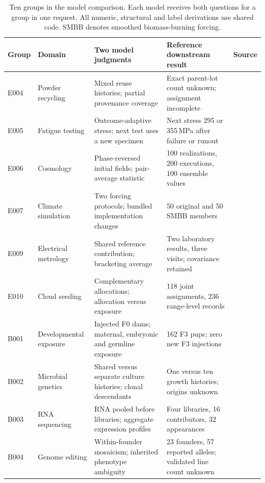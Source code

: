\begin{table}[t]
\centering
\footnotesize
\setlength{\tabcolsep}{4pt}
\begin{tabular}{@{}p{}p{}p{}p{}p{}@{}}
\toprule
Group & Domain & Two model judgments & Reference downstream result & Source \\
\midrule
E004 & Powder recycling & Mixed reuse histories; partial provenance coverage & Exact parent-lot count unknown; assignment incomplete & \citep{koushik2023effective} \\
E005 & Fatigue testing & Outcome-adaptive stress; next test uses a new specimen & Next stress 295 or 355\,MPa after failure or runout & \citep{magazzeni2023bayesian} \\
E006 & Cosmology & Phase-reversed initial fields; pair-average statistic & 100 realizations, 200 executions, 100 ensemble values & \citep{villaescusa2018statistical} \\
E007 & Climate simulation & Two forcing protocols; bundled implementation changes & 50 original and 50 SMBB members & \citep{ncarUndatedLens2} \\
E009 & Electrical metrology & Shared reference contribution; bracketing average & Two laboratory results, three visits; covariance retained & \citep{galliana2015extensive} \\
E010 & Cloud seeding & Complementary allocations; allocation versus exposure & 118 joint assignments, 236 range-level records & \citep{rasmussen2018evaluation,lawrence2014wyoming} \\
B001 & Developmental exposure & Injected F0 dams; maternal, embryonic and germline exposure & 162 F3 pups; zero new F3 injections & \citep{manikkam2012transgenerational} \\
B002 & Microbial genetics & Shared versus separate culture histories; clonal descendants & One versus ten growth histories; origins unknown & \citep{luria1943mutations} \\
B003 & RNA sequencing & RNA pooled before libraries; aggregate expression profiles & Four libraries, 16 contributors, 32 appearances & \citep{rajkumar2015experimental} \\
B004 & Genome editing & Within-founder mosaicism; inherited phenotype ambiguity & 23 founders, 57 reported alleles; validated line count unknown & \citep{yen2014somatic} \\
\bottomrule
\end{tabular}
\caption{Ten groups in the model comparison. Each model receives both questions for a group in one request. All numeric, structural and label derivations use shared code. SMBB denotes smoothed biomass-burning forcing.}
\label{tab:model-cases}
\end{table}

